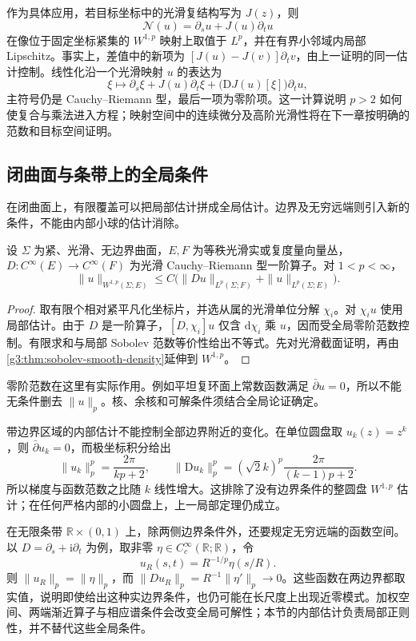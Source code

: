 作为具体应用，若目标坐标中的光滑复结构写为 \(J(z)\)，则
\[
	\mathcal N(u)=\partial_su+J(u)\partial_tu
\]
在像位于固定坐标紧集的 \(W^{1,p}\) 映射上取值于 \(L^p\)，并在有界小邻域内局部 Lipschitz。事实上，差值中的新项为 \([J(u)-J(v)]\partial_tv\)，由上一证明的同一估计控制。线性化沿一个光滑映射 \(u\) 的表达为
\[
	\xi\longmapsto\partial_s\xi+J(u)\partial_t\xi
	+\bigl(\mathrm DJ(u)[\xi]\bigr)\partial_tu,
\]
主符号仍是 Cauchy--Riemann 型，最后一项为零阶项。这一计算说明 \(p>2\) 如何使复合与乘法进入方程；映射空间中的连续微分及高阶光滑性将在下一章按明确的范数和目标空间证明。

\subsection{闭曲面与条带上的全局条件}
\label{g3:subsec:1206:03}
在闭曲面上，有限覆盖可以把局部估计拼成全局估计。边界及无穷远端则引入新的条件，不能由内部小球的估计消除。

\begin{proposition}\label{g3:prop:cr-closed-estimate}
	设 \(\Sigma\) 为紧、光滑、无边界曲面，\(E,F\) 为等秩光滑实或复度量向量丛，\(D:C^\infty(E)\to C^\infty(F)\) 为光滑 Cauchy--Riemann 型一阶算子。对 \(1<p<\infty\)，
	\[
		\|u\|_{W^{1,p}(\Sigma;E)}\le C\bigl(\|Du\|_{L^p(\Sigma;F)}+\|u\|_{L^p(\Sigma;E)}\bigr).
	\]
\end{proposition}
\begin{proof}
	取有限个相对紧平凡化坐标片，并选从属的光滑单位分解 \(\chi_i\)。对 \(\chi_i u\) 使用局部估计。由于 \(D\) 是一阶算子，\([D,\chi_i]u\) 仅含 \(\mathrm d\chi_i\) 乘 \(u\)，因而受全局零阶范数控制。有限求和与局部 Sobolev 范数等价性给出不等式。先对光滑截面证明，再由\cref{g3:thm:sobolev-smooth-density}延伸到 \(W^{1,p}\)。
\end{proof}

零阶范数在这里有实际作用。例如平坦复环面上常数函数满足 \(\bar\partial u=0\)，所以不能无条件删去 \(\|u\|_p\)。核、余核和可解条件须结合全局论证确定。

\ProseParagraphBreak

带边界区域的内部估计不能控制全部边界附近的变化。在单位圆盘取 \(u_k(z)=z^k\)，则 \(\bar\partial u_k=0\)，而极坐标积分给出
\[
	\|u_k\|_p^p=\frac{2\pi}{kp+2},\qquad
	\|\mathrm Du_k\|_p^p=(\sqrt2k)^p\frac{2\pi}{(k-1)p+2}.
\]
所以梯度与函数范数之比随 \(k\) 线性增大。这排除了没有边界条件的整圆盘 \(W^{1,p}\) 估计；在任何严格内部的小圆盘上，上一局部定理仍成立。

\ProseParagraphBreak

在无限条带 \(\mathbb R\times(0,1)\) 上，除两侧边界条件外，还要规定无穷远端的函数空间。以 \(D=\partial_s+\mathrm i\partial_t\) 为例，取非零 \(\eta\in C_c^\infty(\mathbb R;\mathbb R)\)，令
\[
	u_R(s,t)=R^{-1/p}\eta(s/R).
\]
则 \(\|u_R\|_p=\|\eta\|_p\)，而 \(\|Du_R\|_p=R^{-1}\|\eta'\|_p\to0\)。这些函数在两边界都取实值，说明即使给出这种实边界条件，也仍可能在长尺度上出现近零模式。加权空间、两端渐近算子与相应谱条件会改变全局可解性；本节的内部估计负责局部正则性，并不替代这些全局条件。
